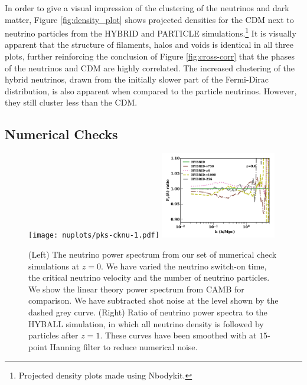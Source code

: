 \documentclass[useAMS, usenatbib]{mnras}
\begin{document}
In order to give a visual impression of the clustering of the neutrinos and dark matter, Figure \ref{fig:density_plot} shows projected densities for the CDM next to neutrino particles from the HYBRID and PARTICLE simulations.\footnote{Projected density plots made using Nbodykit.} It is visually apparent that the structure of filaments, halos and voids is identical in all three plots, further reinforcing the conclusion of Figure \ref{fig:cross-corr} that the phases of the neutrinos and CDM are highly correlated. The increased clustering of the hybrid neutrinos, drawn from the initially slower part of the Fermi-Dirac distribution, is also apparent when compared to the particle neutrinos. However, they still cluster less than the CDM.

\subsection{Numerical Checks}

\begin{figure}
  \texttt{[image: nuplots/pks-cknu-1.pdf]}
  \includegraphics[width=0.45\textwidth]{nuplots/pks_nu_ckrel-1.pdf}
  \caption{(Left) The neutrino power spectrum from our set of numerical check simulations at $z=0$. We have varied the neutrino switch-on time, the critical neutrino velocity and the number of neutrino particles. We show the linear theory power spectrum from CAMB for comparison. We have subtracted shot noise at the level shown by the dashed grey curve. (Right) Ratio of neutrino power spectra to the HYBALL simulation, in which all neutrino density is followed by particles after $z=1$. These curves have been smoothed with at $15$-point Hanning filter to reduce numerical noise.}
  \label{fig:vcrit}
\end{figure}
\end{document}
